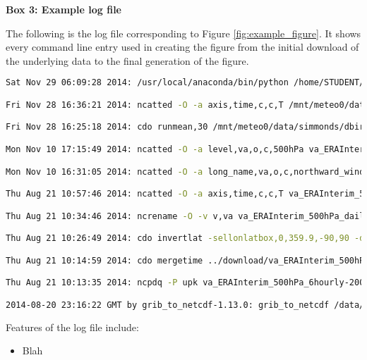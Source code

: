 \textbf{Box 3: Example log file}

The following is the log file corresponding to Figure \ref{fig:example_figure}. It shows every command line entry used in creating the figure from the initial download of the underlying data to the final generation of the figure.  

\begin{lstlisting}[language=bash] 
Sat Nov 29 06:09:28 2014: /usr/local/anaconda/bin/python /home/STUDENT/dbirving/phd/visualisation/plot_hilbert.py /mnt/meteo0/data/simmonds/dbirving/ERAInterim/data/va_ERAInterim_500hPa_030day-runmean_native.nc va hilbert_zw3_w19_va_ERAInterim_500hPa_030day-runmean_native-55S_1986-05-22_2006-07-29.png 1 2 --latitude -55 --dates 1986-05-22 2006-07-29 --wavenumbers 1 9 --figure_size 15 6 (Git hash: 8a42fff) 

Fri Nov 28 16:36:21 2014: ncatted -O -a axis,time,c,c,T /mnt/meteo0/data/simmonds/dbirving/ERAInterim/data/va_ERAInterim_500hPa_030day-runmean_native.nc

Fri Nov 28 16:25:18 2014: cdo runmean,30 /mnt/meteo0/data/simmonds/dbirving/ERAInterim/data/va_ERAInterim_500hPa_daily_native.nc /mnt/meteo0/data/simmonds/dbirving/ERAInterim/data/va_ERAInterim_500hPa_030day-runmean_native.nc

Mon Nov 10 17:15:49 2014: ncatted -O -a level,va,o,c,500hPa va_ERAInterim_500hPa_daily_native.nc

Mon Nov 10 16:31:05 2014: ncatted -O -a long_name,va,o,c,northward_wind va_ERAInterim_500hPa_daily_native.nc

Thu Aug 21 10:57:46 2014: ncatted -O -a axis,time,c,c,T va_ERAInterim_500hPa_daily_native.nc

Thu Aug 21 10:34:46 2014: ncrename -O -v v,va va_ERAInterim_500hPa_daily_native.nc

Thu Aug 21 10:26:49 2014: cdo invertlat -sellonlatbox,0,359.9,-90,90 -daymean va_ERAInterim_500hPa_6hourly_native.nc va_ERAInterim_500hPa_daily_native.nc

Thu Aug 21 10:14:59 2014: cdo mergetime ../download/va_ERAInterim_500hPa_6hourly-1979-1988_native_unpacked.nc ../download/va_ERAInterim_500hPa_6hourly-1989-1998_native_unpacked.nc ../download/va_ERAInterim_500hPa_6hourly-1999-2008_native_unpacked.nc ../download/va_ERAInterim_500hPa_6hourly-2009-2014_native_unpacked.nc va_ERAInterim_500hPa_6hourly_native.nc 

Thu Aug 21 10:13:35 2014: ncpdq -P upk va_ERAInterim_500hPa_6hourly-2009-2014_native.nc va_ERAInterim_500hPa_6hourly-2009-2014_native_unpacked.nc

2014-08-20 23:16:22 GMT by grib_to_netcdf-1.13.0: grib_to_netcdf /data/data01/netcdf-atls04-20140820231025-46030-4696.target -o /data/data01/netcdf-atls04-20140820231553-46030-4697.nc
\end{lstlisting}

Features of the log file include:
\begin{itemize}
\item Blah
\end{itemize}

